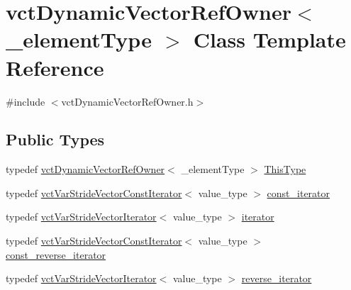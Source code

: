 \hypertarget{classvct_dynamic_vector_ref_owner}{}\section{vct\+Dynamic\+Vector\+Ref\+Owner$<$ \+\_\+element\+Type $>$ Class Template Reference}
\label{classvct_dynamic_vector_ref_owner}


{\ttfamily \#include $<$vct\+Dynamic\+Vector\+Ref\+Owner.\+h$>$}

\subsection*{Public Types}
\begin{DoxyCompactItemize}
\item 
typedef \hyperlink{classvct_dynamic_vector_ref_owner}{vct\+Dynamic\+Vector\+Ref\+Owner}$<$ \+\_\+element\+Type $>$ \hyperlink{classvct_dynamic_vector_ref_owner_a9f1aa02eeb60e1b554086aad69baa458}{This\+Type}
\item 
typedef \hyperlink{classvct_var_stride_vector_const_iterator}{vct\+Var\+Stride\+Vector\+Const\+Iterator}$<$ value\+\_\+type $>$ \hyperlink{classvct_dynamic_vector_ref_owner_a4f7a05e13925c0eeb1d5c754c3193ba0}{const\+\_\+iterator}
\item 
typedef \hyperlink{classvct_var_stride_vector_iterator}{vct\+Var\+Stride\+Vector\+Iterator}$<$ value\+\_\+type $>$ \hyperlink{classvct_dynamic_vector_ref_owner_aaee0b96d24843f333909f2aba3aad782}{iterator}
\item 
typedef \hyperlink{classvct_var_stride_vector_const_iterator}{vct\+Var\+Stride\+Vector\+Const\+Iterator}$<$ value\+\_\+type $>$ \hyperlink{classvct_dynamic_vector_ref_owner_a9ab3900ecbd8f4d4eb4615a2c9a972a3}{const\+\_\+reverse\+\_\+iterator}
\item 
typedef \hyperlink{classvct_var_stride_vector_iterator}{vct\+Var\+Stride\+Vector\+Iterator}$<$ value\+\_\+type $>$ \hyperlink{classvct_dynamic_vector_ref_owner_a3949acd3baa131459d464b058d249990}{reverse\+\_\+iterator}
\end{DoxyCompactItemize}
